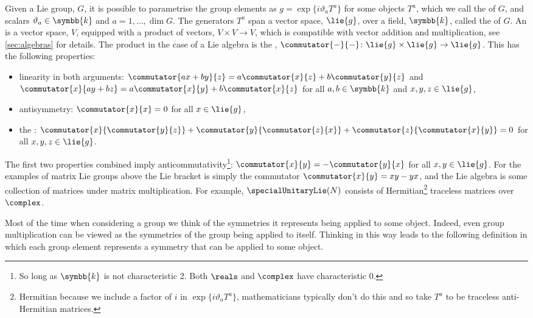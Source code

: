\documentclass[fleqn]{NotesClass}
\renewcommand{\field}{\symbb{k}}
\begin{document}
    Given a Lie group, \(G\), it is possible to parametrise the group elements as \(g = \exp\{i\vartheta_aT^a\}\) for some objects \(T^a\), which we call the  of \(G\), and scalars \(\vartheta_a \in \field\) and \(a = 1, \dotsc, \dim G\).
    The generators \(T^a\) span a vector space, \(\lie{g}\), over a field, \(\field\), called the  of \(G\).
    An  is a vector space, \(V\), equipped with a product of vectors, \(V \times V \to V\), which is compatible with vector addition and multiplication, see \cref{sec:algebras} for details.
    The product in the case of a Lie algebra is the , \(\commutator{-}{-} \colon \lie{g} \times \lie{g} \to \lie{g}\).
    This has the following properties:
    \begin{itemize}
        \item linearity in both arguments: \(\commutator{ax + by}{z} = a\commutator{x}{z} + b\commutator{y}{z}\) and \(\commutator{x}{ay + bz} = a\commutator{x}{y} + b\commutator{x}{z}\) for all \(a, b \in \field\) and \(x, y, z \in \lie{g}\),
        \item antisymmetry: \(\commutator{x}{x} = 0\) for all \(x \in \lie{g}\),
        \item the : \(\commutator{x}{\commutator{y}{z}} + \commutator{y}{\commutator{z}{x}} + \commutator{z}{\commutator{x}{y}} = 0\) for all \(x, y, z \in \lie{g}\).
    \end{itemize}
    The first two properties combined imply anticommutativity\footnote{So long as \(\field\) is not characteristic 2. Both \(\reals\) and \(\complex\) have characteristic 0.}: \(\commutator{x}{y} = -\commutator{y}{x}\) for all \(x, y \in \lie{g}\).
    For the examples of matrix Lie groups above the Lie bracket is simply the commutator \(\commutator{x}{y} = xy - yx\), and the Lie algebra is some collection of matrices under matrix multiplication.
    For example, \(\specialUnitaryLie(N)\) consists of Hermitian\footnote{Hermitian because we include a factor of \(i\) in \(\exp\{i\vartheta_a T^a\}\), mathematicians typically don't do this and so take \(T^a\) to be traceless anti-Hermitian matrices.} traceless matrices over \(\complex\).
    
    Most of the time when considering a group we think of the symmetries it represents being applied to some object.
    Indeed, even group multiplication can be viewed as the symmetries of the group being applied to itself.
    Thinking in this way leads to the following definition in which each group element represents a symmetry that can be applied to some object.
    
\end{document}
